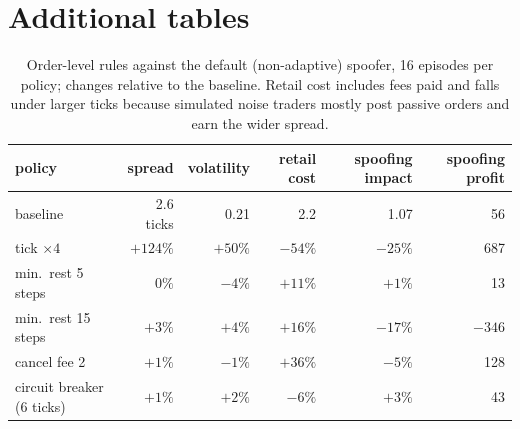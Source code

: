 \documentclass[11pt,a4paper]{article}
\begin{document}
\begin{table}[h]
\centering\footnotesize
{}
\caption{Single market: best-responding ring against each policy; net benefit with fines of $m=5$ and $m=10$ times the gain.}\label{tab:policy}
\end{table}

\section{Additional tables}
\begin{table}[h]
\centering\footnotesize
{}
\caption{Ablations and sensitivity of the signed test in a clean market (16 episodes per row, 95\% bootstrap intervals). ``Honest flagged'' is the share of honest accounts with $p\le0.01$.}\label{tab:ablation}
\end{table}

\begin{table}[h]
\centering\footnotesize
\begin{tabular}{lrrrrr}
\toprule
policy & spread & volatility & retail cost & spoofing impact & spoofing profit\\
\midrule
baseline & 2.6 ticks & 0.21 & 2.2 & 1.07 & 56\\
tick $\times4$ & $+124\%$ & $+50\%$ & $-54\%$ & $-25\%$ & 687\\
min.\ rest 5 steps & $0\%$ & $-4\%$ & $+11\%$ & $+1\%$ & 13\\
min.\ rest 15 steps & $+3\%$ & $+4\%$ & $+16\%$ & $-17\%$ & $-346$\\
cancel fee 2 & $+1\%$ & $-1\%$ & $+36\%$ & $-5\%$ & 128\\
circuit breaker (6 ticks) & $+1\%$ & $+2\%$ & $-6\%$ & $+3\%$ & 43\\
\bottomrule
\end{tabular}
\caption{Order-level rules against the default (non-adaptive) spoofer, 16 episodes per policy; changes relative to the baseline. Retail cost includes fees paid and falls under larger ticks because simulated noise traders mostly post passive orders and earn the wider spread.}\label{tab:order}
\end{table}



\end{document}
